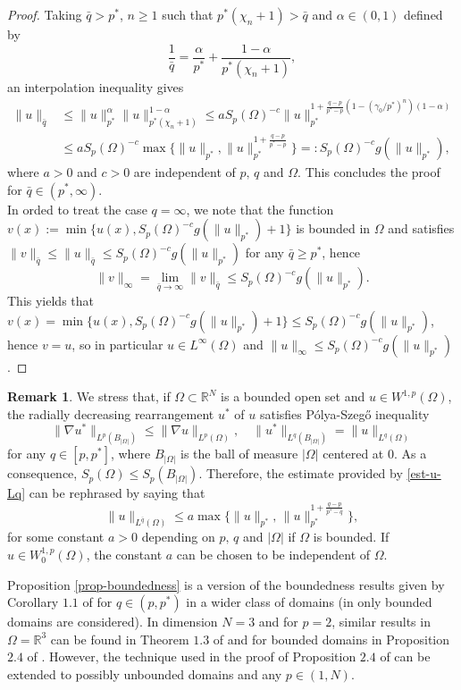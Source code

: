 \documentclass[11pt,reqno]{amsart}
\theoremstyle{definition}
\newtheorem{remark}[theorem]{Remark}
\numberwithin{equation}{section}
\numberwithin{theorem}{section}
\numberwithin{equation}{section}
\numberwithin{theorem}{section}
\newcommand{\R}{\mathbb{R}}
\begin{document}
\begin{proof}
Taking $\bar{q}>p^*$, $n\ge 1$ such that $p^*(\chi_n+1)>\bar{q}$ and $\alpha\in(0,1)$ defined by $$\frac{1}{\bar{q}}=\frac{\alpha}{p^*}+\frac{1-\alpha}{p^*(\chi_n+1)},$$  
an interpolation inequality gives
\begin{equation}
\begin{aligned}
\|u\|_{\bar{q}}&\le \|u\|_{p^*}^\alpha\|u\|^{1-\alpha}_{p^{*}(\chi_n+1)} \le a S_p(\Omega)^{-c}
\|u\|_{p^*}^{1+\frac{q-p}{p^*-p}(1-(\gamma_0/p^*)^n)(1-\alpha)}\\
&\le a S_p(\Omega)^{-c}\max\{\|u\|_{p^*},\|u\|_{p^*}^{1+\frac{q-p}{p^*-p}}\}=:S_p(\Omega)^{-c}g(\|u\|_{p^*}),    
\end{aligned} 
\end{equation}
where $a>0$ and $c>0$ are independent of $p,\,q$ and $\Omega$. This concludes the proof for $\bar{q}\in(p^*,\infty)$.\\
								
In orded to treat the case $q=\infty$, we note that the function $v(x):=\min\{u(x),S_p(\Omega)^{-c}g(\|u\|_{p^*})+1\}$ is bounded in $\Omega$ and satisfies $\|v\|_{\bar{q}}\le\|u\|_{\bar{q}}\le S_p(\Omega)^{-c}g(\|u\|_{p^*})$ for any $\bar{q}\ge p^*$, hence
$$\|v\|_\infty=\lim_{\bar{q}\to\infty}\|v\|_{\bar{q}}\le S_p(\Omega)^{-c}g(\|u\|_{p^*}).$$
This yields that $v(x)=\min\{u(x),S_p(\Omega)^{-c}g(\|u\|_{p^*})+1\}\le S_p(\Omega)^{-c}g(\|u\|_{p^*})$, hence $v=u$, so in particular $u\in L^\infty(\Omega)$ and $\|u\|_\infty\le S_p(\Omega)^{-c}g(\|u\|_{p^*})$.
\end{proof}
\begin{remark}
We stress that, if $\Omega\subset\R^N$ is a bounded open set and $u\in W^{1,p}(\Omega)$, the radially decreasing rearrangement $u^*$ of $u$ satisfies P\'olya-Szeg\H{o} inequality
$$\|\nabla u^*\|_{L^p(B_{|\Omega|})}\le\|\nabla u\|_{L^p(\Omega)},\quad\|u^*\|_{L^q(B_{|\Omega|})}=\|u\|_{{L^q(\Omega)}}$$
for any $q\in[p,p^*]$, where $B_{|\Omega|}$ is the ball of measure $|\Omega|$ centered at $0$. As a consequence, $S_p(\Omega)\le S_p(B_{|\Omega|})$. Therefore, the estimate provided by \eqref{est-u-Lq} can be rephrased by saying that
\begin{equation}\label{est-u-Lq-unif}
\|u\|_{L^{\bar{q}}(\Omega)}\le a\max\{\|u\|_{p^*},\,\|u\|_{p^*}^{1+\frac{q-p}{p^*-q}}\},
\end{equation}
for some constant $a>0$ depending on $p,\,q$ and $|\Omega|$ if $\Omega$ is bounded. If $u\in W^{1,p}_0(\Omega)$, the constant $a$ can be chosen to be independent of $\Omega$.
\end{remark}
Proposition \ref{prop-boundedness} is a version of the boundedness results given by Corollary $1.1$ of \cite{guedda1989quasilinear} for $q\in(p,p^*)$ in a wider class of domains (in \cite{guedda1989quasilinear} only bounded domains are considered). In dimension $N=3$ and for $p=2$, similar results in $\Omega=\R^3$ can be found in Theorem $1.3$ of \cite{pucci2024bifurcation} and for bounded domains in Proposition $2.4$ of \cite{PR}. However, the technique used in the proof of Proposition $2.4$ of \cite{PR} can be extended to possibly unbounded domains and any $p\in(1,N)$.\\
\end{document}
